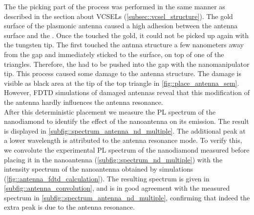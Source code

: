 			The the picking part of the \pp process was performed in the same manner as described in the section about VCSELs (\cref{subsec::vcsel_structure}).
			The gold surface of the plasmonic antenna caused a high adhesion between the antenna surface and the \nd.
			Once the \nd touched the gold, it could not be picked up again with the tungsten tip.
			The \nd first touched the antnna structure a few nanometers away from the gap and immediately sticked to the surface, on top of one of the triangles.
			Therefore, the \nd had to be pushed into the gap with the nanomanipulator tip.
			This process caused some damage to the antenna structure.
			The damage is visible as black area at the tip of the top triangle in \cref{fig::place_antenna_sem}.
			However, FDTD simulations of damaged antennas reveal that this modification of the antenna hardly influences the antenna resonance.
			\\
			After this deterministic placement we measure the PL spectrum of the nanodiamond to identify the effect of the nanoantenna on its emission. The result is displayed in \cref{subfig::spectrum_antenna_nd_multiple}.
			The additional peak at a lower wavelength is attributed to the antenna resonance mode. 
			To verify this, we convolute the experimental PL spectrum of the nanodiamond measured before placing it in the nanoantenna (\cref{subfig::spectrum_nd_multiple}) with the intensity spectrum of the nanoantenna obtained by simulations (\cref{fig::antenna_fdtd_calculation}). 
			The resulting spectrum is given in \cref{subfig::antenna_convolution}, and is in good agreement with the measured spectrum in \cref{subfig::spectrum_antenna_nd_multiple}, confirming that indeed the extra peak is due to the antenna resonance.

